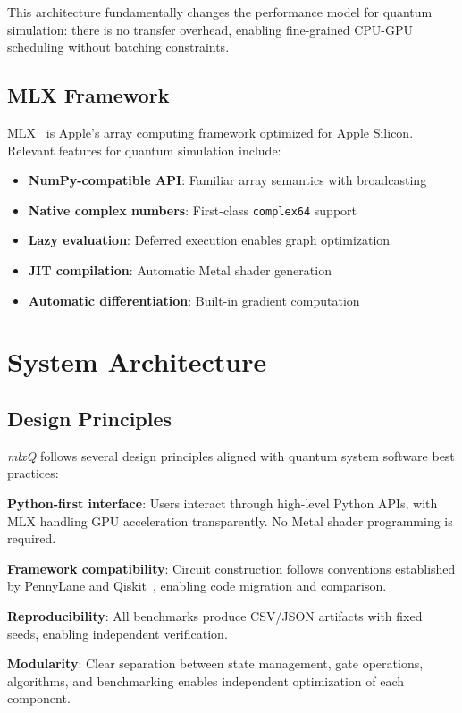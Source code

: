 \documentclass[runningheads]{llncs}
\newcommand{\mlxquantum}{\textit{mlxQ}\xspace}
\begin{document}
This architecture fundamentally changes the performance model for quantum simulation: there is no transfer overhead, enabling fine-grained CPU-GPU scheduling without batching constraints.

\subsection{MLX Framework}

MLX~\cite{MLXFramework2024} is Apple's array computing framework optimized for Apple Silicon. Relevant features for quantum simulation include:
\begin{itemize}
    \item \textbf{NumPy-compatible API}: Familiar array semantics with broadcasting
    \item \textbf{Native complex numbers}: First-class \texttt{complex64} support
    \item \textbf{Lazy evaluation}: Deferred execution enables graph optimization
    \item \textbf{JIT compilation}: Automatic Metal shader generation
    \item \textbf{Automatic differentiation}: Built-in gradient computation
\end{itemize}

\section{System Architecture}

\subsection{Design Principles}

\mlxquantum follows several design principles aligned with quantum system software best practices:

\textbf{Python-first interface}: Users interact through high-level Python APIs, with MLX handling GPU acceleration transparently. No Metal shader programming is required.

\textbf{Framework compatibility}: Circuit construction follows conventions established by PennyLane and Qiskit~\cite{PennyLane2022,Qiskit2023}, enabling code migration and comparison.

\textbf{Reproducibility}: All benchmarks produce CSV/JSON artifacts with fixed seeds, enabling independent verification.

\textbf{Modularity}: Clear separation between state management, gate operations, algorithms, and benchmarking enables independent optimization of each component.
\end{document}
